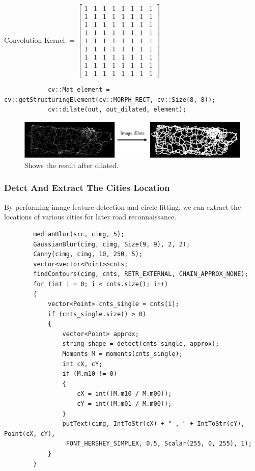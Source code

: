 \documentclass{article} %
\begin{document}
    \centerline{Convolution Kernel $=\left[\begin{array}{cccccccc}{1} & {1} & {1} & {1} & {1} & {1} & {1} & {1} \\ {1} & {1} & {1} & {1} & {1} & {1} & {1} & {1} \\ {1} & {1} & {1} & {1} & {1} & {1} & {1} & {1} \\ {1} & {1} & {1} & {1} & {1} & {1} & {1} & {1} \\ {1} & {1} & {1} & {1} & {1} & {1} & {1} & {1} \\ {1} & {1} & {1} & {1} & {1} & {1} & {1} & {1} \\ {1} & {1} & {1} & {1} & {1} & {1} & {1} & {1} \\ {1} & {1} & {1} & {1} & {1} & {1} & {1} & {1} \\ {1} & {1} & {1} & {1} & {1} & {1} & {1} & {1}\end{array}\right]$}

    \lstset {language=C++}
        \begin{lstlisting}
            cv::Mat element = cv::getStructuringElement(cv::MORPH_RECT, cv::Size(8, 8));
            cv::dilate(out, out_dilated, element);
    \end{lstlisting}

    
    \begin{figure}[h]
        \centering
            \includegraphics[scale=0.6]{dilate.png}
        \caption{Shows the result after dilated.}
    \end{figure}

\subsubsection{Detct And Extract The Cities Location}
By performing image feature detection and circle fitting, 
we can extract the locations of various cities for later road reconnaissance.
    \lstset {language=C++}
    \begin{lstlisting}
        medianBlur(src, cimg, 5);
        GaussianBlur(cimg, cimg, Size(9, 9), 2, 2);
        Canny(cimg, cimg, 10, 250, 5);
        vector<vector<Point>>cnts;
        findContours(cimg, cnts, RETR_EXTERNAL, CHAIN_APPROX_NONE);
        for (int i = 0; i < cnts.size(); i++)
        {
            vector<Point> cnts_single = cnts[i];
            if (cnts_single.size() > 0)
            {
                vector<Point> approx;
                string shape = detect(cnts_single, approx);
                Moments M = moments(cnts_single);
                int cX, cY;
                if (M.m10 != 0)
                {
                    cX = int((M.m10 / M.m00));
                    cY = int((M.m01 / M.m00));
                }
                putText(cimg, IntToStr(cX) + " , " + IntToStr(cY), Point(cX, cY),
                 FONT_HERSHEY_SIMPLEX, 0.5, Scalar(255, 0, 255), 1);  
            }
        }
    \end{lstlisting}
\end{document}
